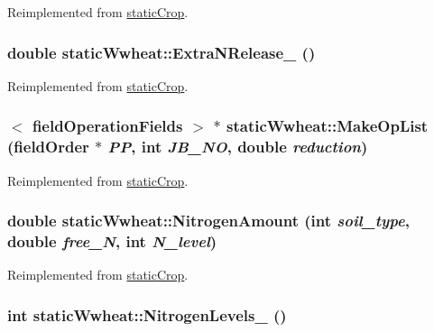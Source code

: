 Reimplemented from \hyperlink{classstatic_crop_ab7b9a8ecb31b10c4dcf44f13000e2f8c}{staticCrop}.\hypertarget{classstatic_wwheat_a96c132fcd9b33934b75c887329d9c09c}{
\subsubsection[{ExtraNRelease\_\-}]{\setlength{\rightskip}{0pt plus 5cm}double staticWwheat::ExtraNRelease\_\- ()}}
\label{classstatic_wwheat_a96c132fcd9b33934b75c887329d9c09c}


Reimplemented from \hyperlink{classstatic_crop_afe0cb8a7831afa941a37338f05227d67}{staticCrop}.\hypertarget{classstatic_wwheat_a7ad6be729608506d81e911675dc9ae1f}{
\subsubsection[{MakeOpList}]{$<$ {\bf fieldOperationFields} $>$ $\ast$ staticWwheat::MakeOpList ({\bf fieldOrder} $\ast$ {\em PP}, \/  int {\em JB\_\-NO}, \/  double {\em reduction})}}
\label{classstatic_wwheat_a7ad6be729608506d81e911675dc9ae1f}


Reimplemented from \hyperlink{classstatic_crop_a9b67ef1ae531a3afb32b63a4aeb5916b}{staticCrop}.\hypertarget{classstatic_wwheat_a5ef5878549be7108d8fda9ef63b2bc34}{
\subsubsection[{NitrogenAmount}]{\setlength{\rightskip}{0pt plus 5cm}double staticWwheat::NitrogenAmount (int {\em soil\_\-type}, \/  double {\em free\_\-N}, \/  int {\em N\_\-level})}}
\label{classstatic_wwheat_a5ef5878549be7108d8fda9ef63b2bc34}


Reimplemented from \hyperlink{classstatic_crop_af3aa85321a8a75406f8a0751b71587d0}{staticCrop}.\hypertarget{classstatic_wwheat_ab6756889c263146d276fe9e5f09469ca}{
\subsubsection[{NitrogenLevels\_\-}]{\setlength{\rightskip}{0pt plus 5cm}int staticWwheat::NitrogenLevels\_\- ()}}
\label{classstatic_wwheat_ab6756889c263146d276fe9e5f09469ca}


